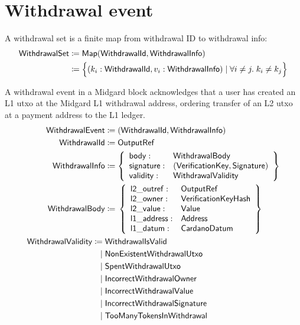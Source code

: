 \documentclass[../midgard.tex]{subfiles}
\begin{document}
\section{Withdrawal event}
\label{h:withdrawal-event}

A withdrawal set is a finite map from withdrawal ID to withdrawal info:
\begin{align*}
    \mathsf{WithdrawalSet} &\coloneq \mathsf{Map(WithdrawalId, WithdrawalInfo)} \\
      &\coloneq \Bigl\{
        (k_i: \mathsf{WithdrawalId}, v_i: \mathsf{WithdrawalInfo}) \mid \forall i \neq j.\; k_i \neq k_j
    \Bigr\}
\end{align*}

A withdrawal event in a Midgard block acknowledges that a user has created an L1 utxo at the Midgard L1 withdrawal address, ordering transfer of an L2 utxo at a payment address to the L1 ledger.
\begingroup
\allowdisplaybreaks{}
\begin{align*}
    \mathsf{WithdrawalEvent} &\coloneq \mathsf{(WithdrawalId, WithdrawalInfo)} \\
    \mathsf{WithdrawalId} &\coloneq \mathsf{OutputRef} \\
    \mathsf{WithdrawalInfo} &\coloneq \left\{
        \begin{array}{ll}
            \mathsf{body} :& \mathsf{WithdrawalBody} \\
            \mathsf{signature} :& \mathsf{(VerificationKey, Signature)} \\
            \mathsf{validity} :& \mathsf{WithdrawalValidity} \\
        \end{array} \right\}\\
    \mathsf{WithdrawalBody} &\coloneq{} \left\{
        \begin{array}{ll}
            \mathsf{l2\_outref} :& \mathsf{OutputRef} \\
            \mathsf{l2\_owner} :& \mathsf{VerificationKeyHash} \\
            \mathsf{l2\_value} :& \mathsf{Value} \\
            \mathsf{l1\_address} : & \mathsf{Address} \\
            \mathsf{l1\_datum} : & \mathsf{CardanoDatum}
        \end{array} \right\}\\
    \mathsf{WithdrawalValidity} \coloneq\;& \mathsf{WithdrawalIsValid} \\
                               \mid\;& \mathsf{NonExistentWithdrawalUtxo} \\
                               \mid\;& \mathsf{SpentWithdrawalUtxo} \\
                               \mid\;& \mathsf{IncorrectWithdrawalOwner} \\
                               \mid\;& \mathsf{IncorrectWithdrawalValue} \\
                               \mid\;& \mathsf{IncorrectWithdrawalSignature} \\
                               \mid\;& \mathsf{TooManyTokensInWithdrawal}
\end{align*}
\endgroup
\end{document}
